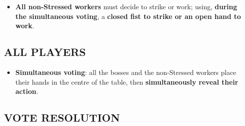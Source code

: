         \begin{itemize}
            \item \textbf{All non-Stressed workers} must decide to strike or work; using, \textbf{during the
            simultaneous voting}, a \textbf{closed fist to strike or an open hand to work}.
        \end{itemize}
    
    \subsection{ALL PLAYERS}

        \begin{itemize}
            \item \textbf{Simultaneous voting}: all the bosses and the non-Stressed workers place
            their hands in the centre of the table, then \textbf{simultaneously reveal their action}.
        \end{itemize}
    
    \subsection{VOTE RESOLUTION}

